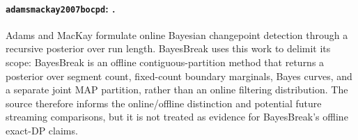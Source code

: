 
\paragraph{\texttt{adamsmackay2007bocpd}: \citet{adamsmackay2007bocpd}.}
Adams and MacKay formulate online Bayesian changepoint detection through a recursive posterior over run length. BayesBreak uses this work to delimit its scope: BayesBreak is an offline contiguous-partition method that returns a posterior over segment count, fixed-count boundary marginals, Bayes curves, and a separate joint MAP partition, rather than an online filtering distribution. The source therefore informs the online/offline distinction and potential future streaming comparisons, but it is not treated as evidence for BayesBreak's offline exact-DP claims.
